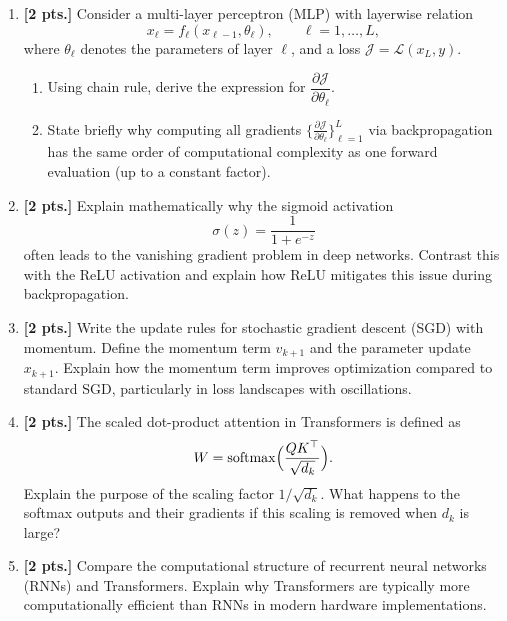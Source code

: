 \documentclass[11pt,a4paper]{article}
\DeclareMathOperator{\softmax}{softmax}
\newcommand{\examstatement}[1]{%
  \par\addvspace{0.85em}%
  \noindent{\bfseries #1}\par\nobreak\addvspace{0.28em}%
}
\begin{document}
\examstatement{Problem 1. [10 pts.]}
\begin{enumerate}[label=(\alph*)]
    \item \textbf{[2 pts.]} Consider a multi-layer perceptron (MLP) with layerwise relation
    \[
    x_{\ell} = f_{\ell}(x_{\ell-1}, \theta_{\ell}), \qquad \ell = 1, \dots, L,
    \]
    where $\theta_{\ell}$ denotes the parameters of layer $\ell$, and a loss $\mathcal{J} = \mathcal{L}(x_L, y)$.
    \begin{enumerate}[label=(\roman*)]
        \item Using chain rule, derive the expression for $\dfrac{\partial \mathcal{J}}{\partial \theta_{\ell}}$.
        \item State briefly why computing all gradients $\bigl\{\frac{\partial \mathcal{J}}{\partial \theta_{\ell}}\bigr\}_{\ell=1}^{L}$ via backpropagation has the same order of computational complexity as one forward evaluation (up to a constant factor).
    \end{enumerate}
    \item \textbf{[2 pts.]} Explain mathematically why the sigmoid activation
    \[
    \sigma(z) = \frac{1}{1 + e^{-z}}
    \]
    often leads to the vanishing gradient problem in deep networks. Contrast this with the ReLU activation and explain how ReLU mitigates this issue during backpropagation.
    \item \textbf{[2 pts.]} Write the update rules for stochastic gradient descent (SGD) with momentum. Define the momentum term $v_{k+1}$ and the parameter update $x_{k+1}$. Explain how the momentum term improves optimization compared to standard SGD, particularly in loss landscapes with oscillations.
    \item \textbf{[2 pts.]} The scaled dot-product attention in Transformers is defined as
    \[
    W = \softmax\Bigl(\frac{Q K^{\top}}{\sqrt{d_k}}\Bigr).
    \]
    Explain the purpose of the scaling factor $1/\sqrt{d_k}$. What happens to the softmax outputs and their gradients if this scaling is removed when $d_k$ is large?
    \item \textbf{[2 pts.]} Compare the computational structure of recurrent neural networks (RNNs) and Transformers. Explain why Transformers are typically more computationally efficient than RNNs in modern hardware implementations.
\end{enumerate}
\end{document}

